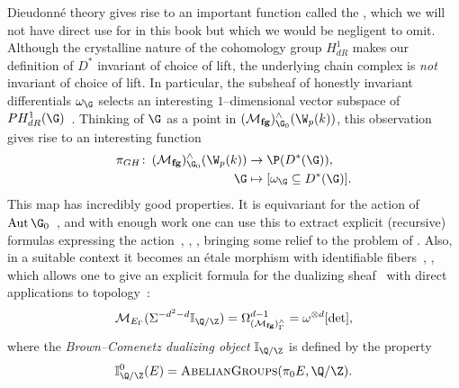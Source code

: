 \begin{remark}\label{ThePeriodMapSection}
Dieudonn\'e theory gives rise to an important function called the , which we will not have direct use for in this book but which we would be negligent to omit.  Although the crystalline nature of the cohomology group \(H^1_{dR}\) makes our definition of \(D^*\) invariant of choice of lift, the underlying chain complex is \emph{not} invariant of choice of lift.  In particular, the subsheaf of honestly invariant differentials \(\omega_{\G}\) selects an interesting \(1\)--dimensional vector subspace of \(PH^1_{dR}(\G)\)~\cite[Section 2.3]{MoravaCobordismComodules}.  Thinking of \(\G\) as a point in \((\moduli{fg})^\wedge_{\G_0}(\W_p(k))\), this observation gives rise to an interesting function
\begin{align*}
\pi_{GH}\co (\moduli{fg})^\wedge_{\G_0}(\W_p(k)) & \to \P(D^*(\G)), \\
\G & \mapsto [\omega_{\G} \subseteq D^*(\G)].
\end{align*}
This map has incredibly good properties.  It is equivariant for the action of \(\Aut \G_0\)~\cite[Theorem 1]{HopkinsGrossAnnouncement}, and with enough work one can use this to extract explicit (recursive) formulas expressing the action~\cite{DevinatzHopkins}, \cite[Section 24]{StricklandFPFP}, \cite[Section 22]{HopkinsGrossEquivVBs}, bringing some relief to the problem of .  Also, in a suitable context it becomes an \'etale morphism with identifiable fibers~\cite[Theorem 1]{HopkinsGrossAnnouncement}, \cite[Sections 23-4]{HopkinsGrossEquivVBs}, which allows one to give an explicit formula for the dualizing sheaf~\cite[Corollary 3]{HopkinsGrossAnnouncement} with direct applications to topology~\cite[Theorem 6]{HopkinsGrossAnnouncement}: \[\context{E_\Gamma}(\Susp^{-d^2 - d} \mathbb I_{\Q/\Z}) = \Omega^{d - 1}_{(\moduli{fg})^\wedge_\Gamma} = \omega^{\otimes d}[\det],\] where the \textit{Brown--Comenetz dualizing object} \(\mathbb I_{\Q/\Z}\) is defined by the property \[\mathbb I_{\Q/\Z}^0(E) = \CatOf{AbelianGroups}(\pi_0 E, \Q/\Z).\]


\end{remark}
